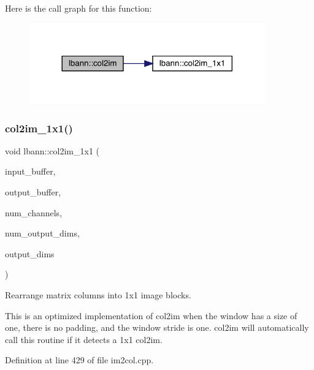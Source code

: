 Here is the call graph for this function\+:\nopagebreak
\begin{figure}[H]
\begin{center}
\leavevmode
\includegraphics[width=288pt]{namespacelbann_ab36806d08e7c852ad9cf3a0564f29b64_cgraph}
\end{center}
\end{figure}
\mbox{\label{namespacelbann_ab4fccda3dc4c2c293d643815dfefe22a}} 
\subsubsection{\texorpdfstring{col2im\+\_\+1x1()}{col2im\_1x1()}}
{\footnotesize\ttfamily void lbann\+::col2im\+\_\+1x1 (\begin{DoxyParamCaption}\item[{const Data\+Type $\ast$}]{input\+\_\+buffer,  }\item[{Data\+Type $\ast$}]{output\+\_\+buffer,  }\item[{const int}]{num\+\_\+channels,  }\item[{const int}]{num\+\_\+output\+\_\+dims,  }\item[{const int $\ast$}]{output\+\_\+dims }\end{DoxyParamCaption})}



Rearrange matrix columns into 1x1 image blocks. 

This is an optimized implementation of col2im when the window has a size of one, there is no padding, and the window stride is one. col2im will automatically call this routine if it detects a 1x1 col2im. 

Definition at line 429 of file im2col.\+cpp.


